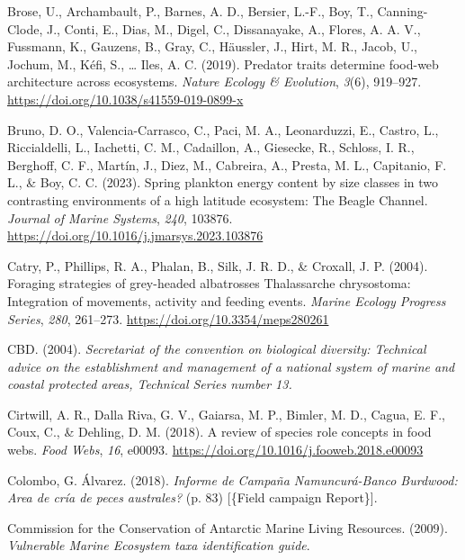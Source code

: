 \documentclass[preprint, 3p,
authoryear]{elsarticle} %
\newlength{\cslhangindent}
\newlength{\cslentryspacingunit} %
\newenvironment{CSLReferences}[2] %
 {%
  \setlength{\parindent}{0pt}
  \ifodd #1
  \let\oldpar\par
  \def\par{\hangindent=\cslhangindent\oldpar}
  \fi
  \setlength{\parskip}{#2\cslentryspacingunit}
 }%
 {}
\begin{document}
\begin{CSLReferences}{1}{0}
\leavevmode{}%
Brose, U., Archambault, P., Barnes, A. D., Bersier, L.-F., Boy, T.,
Canning-Clode, J., Conti, E., Dias, M., Digel, C., Dissanayake, A.,
Flores, A. A. V., Fussmann, K., Gauzens, B., Gray, C., Häussler, J.,
Hirt, M. R., Jacob, U., Jochum, M., Kéfi, S., \ldots{} Iles, A. C.
(2019). Predator traits determine food-web architecture across
ecosystems. \emph{Nature Ecology \& Evolution}, \emph{3}(6), 919--927.
\url{https://doi.org/10.1038/s41559-019-0899-x}

\leavevmode{}%
Bruno, D. O., Valencia-Carrasco, C., Paci, M. A., Leonarduzzi, E.,
Castro, L., Riccialdelli, L., Iachetti, C. M., Cadaillon, A., Giesecke,
R., Schloss, I. R., Berghoff, C. F., Martín, J., Diez, M., Cabreira, A.,
Presta, M. L., Capitanio, F. L., \& Boy, C. C. (2023). Spring plankton
energy content by size classes in two contrasting environments of a high
latitude ecosystem: {The Beagle Channel}. \emph{Journal of Marine
Systems}, \emph{240}, 103876.
\url{https://doi.org/10.1016/j.jmarsys.2023.103876}

\leavevmode{}%
Catry, P., Phillips, R. A., Phalan, B., Silk, J. R. D., \& Croxall, J.
P. (2004). Foraging strategies of grey-headed albatrosses {Thalassarche}
chrysostoma: Integration of movements, activity and feeding events.
\emph{Marine Ecology Progress Series}, \emph{280}, 261--273.
\url{https://doi.org/10.3354/meps280261}

\leavevmode{}%
CBD. (2004). \emph{Secretariat of the convention on biological
diversity: {Technical} advice on the establishment and management of a
national system of marine and coastal protected areas, {Technical
Series} number 13.}

\leavevmode{}%
Cirtwill, A. R., Dalla Riva, G. V., Gaiarsa, M. P., Bimler, M. D.,
Cagua, E. F., Coux, C., \& Dehling, D. M. (2018). A review of species
role concepts in food webs. \emph{Food Webs}, \emph{16}, e00093.
\url{https://doi.org/10.1016/j.fooweb.2018.e00093}

\leavevmode{}%
Colombo, G. Álvarez. (2018). \emph{{Informe de Campaña Namuncurá-Banco
Burdwood: \textquestiondown Area de cría de peces australes?}} (p. 83)
{[}\{Field campaign Report\}{]}.

\leavevmode{}%
Commission for the Conservation of Antarctic Marine Living Resources.
(2009). \emph{Vulnerable {Marine Ecosystem} taxa identification guide}.


\end{CSLReferences}
\end{document}
